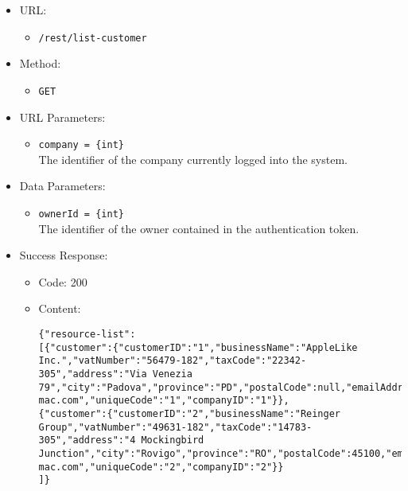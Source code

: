 \begin{itemize}
    
    \item URL: 
    \begin{itemize}
        \item \texttt{/rest/list-customer}
    \end{itemize}
    
    \item Method: 
    \begin{itemize}
        \item \texttt{GET}
    \end{itemize}
    
    \item URL Parameters: 
    \begin{itemize}
        \item \texttt{company = \{int\}} \\
        The identifier of the company currently logged into the system.
    \end{itemize}
    
    \item Data Parameters: 
    \begin{itemize}
        \item \texttt{ownerId = \{int\}} \\
        The identifier of the owner contained in the authentication token.
    \end{itemize}
    
    \item Success Response: 
    \begin{itemize}
        \item Code: 200
        \item Content:
        \begin{lstlisting}
{"resource-list":
[{"customer":{"customerID":"1","businessName":"AppleLike Inc.","vatNumber":"56479-182","taxCode":"22342-305","address":"Via Venezia 79","city":"Padova","province":"PD","postalCode":null,"emailAddress":"applelike@google.com","pec":"applelike@pec-mac.com","uniqueCode":"1","companyID":"1"}},
{"customer":{"customerID":"2","businessName":"Reinger Group","vatNumber":"49631-182","taxCode":"14783-305","address":"4 Mockingbird Junction","city":"Rovigo","province":"RO","postalCode":45100,"emailAddress":"rfrankum1@google.nl","pec":"plyster1@pec-mac.com","uniqueCode":"2","companyID":"2"}}
]}
        \end{lstlisting}    
    \end{itemize}
    

\end{itemize}
